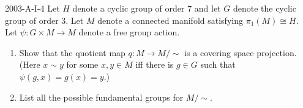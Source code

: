 \documentclass{article}
\begin{document}
	\begin{prb}{2003-A-I-4}
		Let $H$ denote a cyclic group of order 7 and let $G$ denote the cyclic group of order 3. Let $M$ denote a connected manifold satisfying $\pi_1(M) \cong H$. Let $\psi: G \times M \to M$ denote a free group action. \vspace{-0.25cm}
		\begin{enumerate}[itemsep =-2pt,label  = (\alph{*})]
			\item Show that the quotient map $q: M \to M/\sim$ is a covering space projection. (Here $x \sim y$ for some $x, y \in M$ iff there is $g \in G$ such that $\psi(g, x) = g(x) = y$.)
			\item List all the possible fundamental groups for $M/\sim$. 
		\end{enumerate}
	\end{prb}
	\vspace{-0.25cm}
\end{document}
